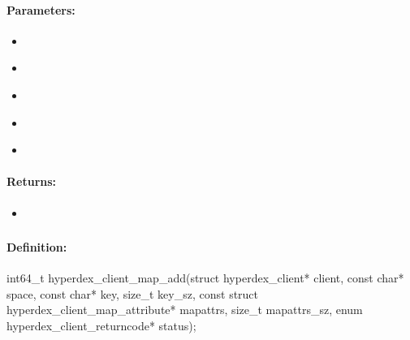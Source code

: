 \paragraph{Parameters:}
\begin{itemize}[noitemsep]
\item {}\\

\item {}\\

\item {}\\

\item {}\\

\item {}\\

\end{itemize}

\paragraph{Returns:}
\begin{itemize}[noitemsep]
\item {}\\

\end{itemize}

\pagebreak
\subsubsection{}
\label{api:c:map_add}


\paragraph{Definition:}
\begin{ccode}
int64_t hyperdex_client_map_add(struct hyperdex_client* client,
        const char* space,
        const char* key, size_t key_sz,
        const struct hyperdex_client_map_attribute* mapattrs, size_t mapattrs_sz,
        enum hyperdex_client_returncode* status);
\end{ccode}

